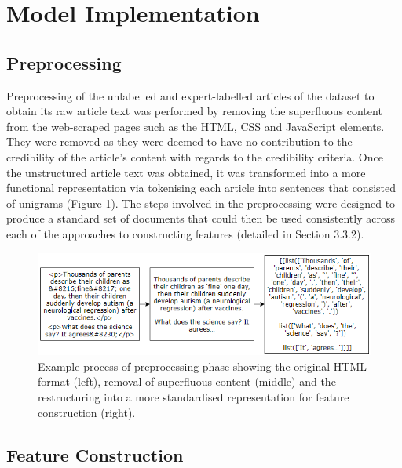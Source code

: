 \documentclass[a4paper,twoside,phd]{BYUPhys}
\begin{document}
\section{Model Implementation}
\label{sec:SystemModel}

\subsection{Preprocessing}
\label{sec:ModelPreprocessing}

Preprocessing of the unlabelled and expert-labelled articles of the dataset to obtain its raw article text was performed by removing the superfluous content from the web-scraped pages such as the HTML, CSS and JavaScript elements. They were removed as they were deemed to have no contribution to the credibility of the article's content with regards to the credibility criteria. Once the unstructured article text was obtained, it was transformed into a more functional representation via tokenising each article into sentences that consisted of unigrams (Figure \ref{fig:PreprocessingExample}). The steps involved in the preprocessing were designed to produce a standard set of documents that could then be used consistently across each of the approaches to constructing features (detailed in Section 3.3.2).

\begin{figure}[H]

	\includegraphics[width=16cm]{images/Preprocessing-example.png}
	\caption{Example process of preprocessing phase showing the original HTML format (left), removal of superfluous content (middle) and the restructuring into a more standardised representation for feature construction (right).}
	\label{fig:PreprocessingExample}
\end{figure}

\subsection{Feature Construction}
\label{sec:ModelFeatureConstruction}
\end{document}
